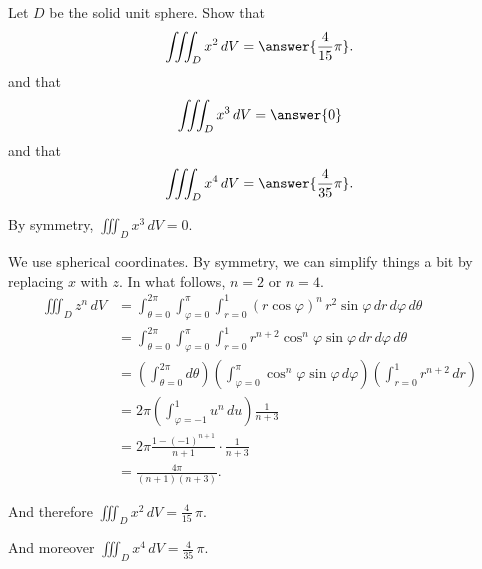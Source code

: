 \documentclass{ximera}
\author{Jim Fowler}
\begin{document}
\begin{exercise}
  
  Let $D$ be the solid unit sphere.  Show that
  \[
    \iiint_D x^2 \, dV = \answer{\frac{4}{15} \pi}.
  \]
  and that
  \[
    \iiint_D x^3 \, dV = \answer{0}
  \]
  and that
  \[
    \iiint_D x^4 \, dV = \answer{\frac{4}{35} \pi}.
  \]

  \begin{hint}
By symmetry, $\iiint_D x^3 \, dV = 0$.
\end{hint}

\begin{hint}
We use spherical coordinates.  By symmetry, we can simplify things a bit by replacing $x$ with $z$.  In what follows, $n = 2$ or $n = 4$.
 \begin{align*}
   \iiint_D z^n \, dV
 &= \int_{\theta=0}^{2\pi} \int_{\varphi=0}^{\pi} \int_{r = 0}^1 (r \cos \varphi)^n \, r^2 \sin \varphi \, dr \, d\varphi \, d\theta \\
 &= \int_{\theta=0}^{2\pi} \int_{\varphi=0}^{\pi} \int_{r = 0}^1 r^{n + 2} \cos^n \varphi \sin \varphi \, dr \, d\varphi \, d\theta \\
 &= \left( \int_{\theta=0}^{2\pi} d\theta \right) \left(\int_{\varphi=0}^{\pi} \cos^n \varphi \sin \varphi \, d\varphi \right) \left( \int_{r = 0}^1 r^{n+2} \, dr \right) \\
 &= 2 \pi \left(\int_{\varphi=-1}^{1} u^n \, du \right) \frac{1}{n+3} \\
 &= 2 \pi \frac{1 - (-1)^{n+1}}{n+1} \cdot \frac{1}{n+3} \\
 &= \frac{4 \pi}{(n+1)(n+3)}.
 \end{align*}
\end{hint}

\begin{hint}
And therefore $\iiint_D x^2 \, dV = \frac{4}{15} \, \pi$.
\end{hint}
\begin{hint}
  And moreover $\iiint_D x^4 \, dV = \frac{4}{35} \, \pi$.
\end{hint}

\end{exercise}
\end{document}
